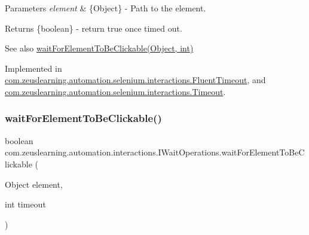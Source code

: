 \begin{DoxyParams}{Parameters}
{\em element} & \{Object\} -\/ Path to the element.\\
\hline
\end{DoxyParams}
\begin{DoxyReturn}{Returns}
\{boolean\} -\/ return {\ttfamily true} once timed out.
\end{DoxyReturn}
\begin{DoxySeeAlso}{See also}
\hyperlink{interfacecom_1_1zeuslearning_1_1automation_1_1interactions_1_1IWaitOperations_a8b6cc8c4332c681818630d1665f79c44}{wait\+For\+Element\+To\+Be\+Clickable(\+Object, int)} 
\end{DoxySeeAlso}


Implemented in \hyperlink{classcom_1_1zeuslearning_1_1automation_1_1selenium_1_1interactions_1_1FluentTimeout_ad9a51efbd23459b848e9640fe0f9a3db}{com.\+zeuslearning.\+automation.\+selenium.\+interactions.\+Fluent\+Timeout}, and \hyperlink{classcom_1_1zeuslearning_1_1automation_1_1selenium_1_1interactions_1_1Timeout_a6c5ac29cf210e232ac851ebe52b9c226}{com.\+zeuslearning.\+automation.\+selenium.\+interactions.\+Timeout}.

\hypertarget{interfacecom_1_1zeuslearning_1_1automation_1_1interactions_1_1IWaitOperations_a8b6cc8c4332c681818630d1665f79c44}{}\label{interfacecom_1_1zeuslearning_1_1automation_1_1interactions_1_1IWaitOperations_a8b6cc8c4332c681818630d1665f79c44} 
\subsubsection{\texorpdfstring{wait\+For\+Element\+To\+Be\+Clickable()}{waitForElementToBeClickable()}\hspace{0.1cm}{\footnotesize\ttfamily [2/2]}}
{\footnotesize\ttfamily boolean com.\+zeuslearning.\+automation.\+interactions.\+I\+Wait\+Operations.\+wait\+For\+Element\+To\+Be\+Clickable (\begin{DoxyParamCaption}\item[{Object}]{element,  }\item[{int}]{timeout }\end{DoxyParamCaption})}

